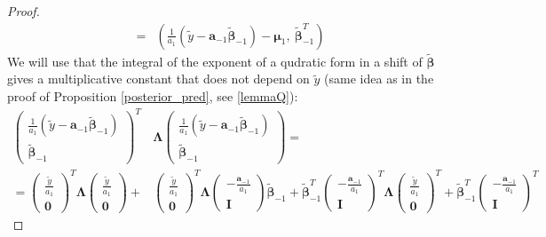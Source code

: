 \documentclass[10pt,fleqn]{amsart}
\theoremstyle{definition}
\theoremstyle{remark}
\numberwithin{equation}{section}
\newcommand{\aaa}{\boldsymbol{a}}
\newcommand{\bbeta}{\boldsymbol{\beta}}
\newcommand{\mmu}{\boldsymbol{\mu}}
\newcommand{\LLambda}{\boldsymbol{\Lambda}}
\newcommand{\bbetatilde}{\widetilde{\bbeta}}
\newcommand{\ytilde}{\widetilde{y}}
\begin{document}
\begin{proof}
\begin{equation*}
\begin{split}
    =&\left(\frac{1}{a_1}\left(\ytilde-\aaa_{-1}\bbetatilde_{-1}\right)-\mmu_1,\ \bbetatilde_{-1}^T\right)
\end{split}\end{equation*}
We will use that the integral of the exponent of a qudratic form in a shift of $\bbetatilde$ gives a multiplicative constant that
does not depend on $\ytilde$
(same idea as in the proof of Proposition \ref{posterior_pred}, see \ref{lemmaQ}):
\begin{equation*}\begin{split}
    \left(\begin{matrix}\frac 1{a_1}\left(\ytilde-\aaa_{-1}\bbetatilde_{-1}\right)\\\bbetatilde_{-1}\end{matrix}\right)^T
    &\LLambda
    \left(\begin{matrix}\frac 1{a_1}\left(\ytilde-\aaa_{-1}\bbetatilde_{-1}\right)\\\bbetatilde_{-1}\end{matrix}\right)=\\
    =\left(\begin{matrix}\frac \ytilde{a_1}\\\boldsymbol{0}\end{matrix}\right)^T
    \LLambda
    \left(\begin{matrix}\frac \ytilde{a_1}\\\boldsymbol{0}\end{matrix}\right)+
    &\left(\begin{matrix}\frac \ytilde{a_1}\\\boldsymbol{0}\end{matrix}\right)^T
    \LLambda
    \left(\begin{matrix}-\frac {\aaa_{-1}}{a_1}\\\boldsymbol{I}\end{matrix}\right)\bbetatilde_{-1}+
    \bbetatilde_{-1}^T\left(\begin{matrix}-\frac {\aaa_{-1}}{a_1}\\\boldsymbol{I}\end{matrix}\right)^T
    \LLambda
    \left(\begin{matrix}\frac \ytilde{a_1}\\\boldsymbol{0}\end{matrix}\right)^T+
    \bbetatilde_{-1}^T\left(\begin{matrix}-\frac {\aaa_{-1}}{a_1}\\\boldsymbol{I}\end{matrix}\right)^T

\end{split}
\end{equation*}
\end{proof}
\end{document}
